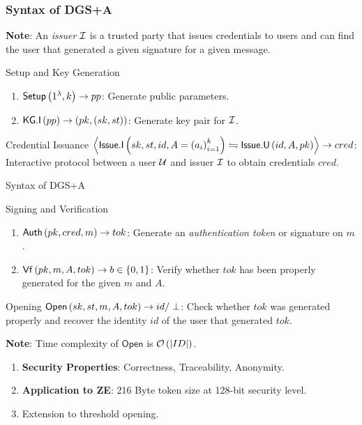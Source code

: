 \documentclass{beamer}
\begin{document}
    \begin{frame}
        \frametitle{Syntax of DGS+A}
        \textbf{Note}: An \emph{issuer} \(\mathcal I\) is a trusted party that issues
        credentials to users and can find the user that generated a given
        signature for a given message.
        \begin{block}{Setup and Key Generation}
            \begin{enumerate}
                \item \(\mathsf{Setup}\left(1^{\lambda}, k\right) \rightarrow pp\):
                Generate public parameters.
                \item \(\mathsf{KG.I}\left(pp\right) \rightarrow
                \left(pk,\left(sk,st\right)\right)\): Generate key pair for \(\mathcal I\).
            \end{enumerate}
        \end{block}
        \begin{block}{Credential Issuance}
            \(\left\langle \mathsf{Issue.I}\left(sk, st, id, A = \left(a_i\right)_{i=1}^k\right) \leftrightharpoons \mathsf{Issue.U}\left(id, A, pk\right) \right\rangle
            \rightarrow cred\): Interactive protocol between a user \(\mathcal U\) 
            and issuer \(\mathcal I\) to obtain credentials \(cred\).
        \end{block}
    \end{frame}

    \begin{frame}{Syntax of DGS+A}
        \begin{block}{Signing and Verification}
            \begin{enumerate}
                \item \(\mathsf{Auth}\left(pk, cred, m\right) \rightarrow tok\):
                Generate an \emph{authentication token} or signature on \(m\).
                \item \(\mathsf{Vf}\left(pk, m, A, tok\right) \rightarrow b \in
                \left\{0,1\right\}\): Verify whether \(tok\) has been properly
                generated for the given \(m\) and \(A\).
            \end{enumerate}
        \end{block}
        \begin{block}{Opening}
            \(\mathsf{Open}\left(sk, st, m, A, tok\right) \rightarrow id/\perp\):
            Check whether \(tok\) was generated properly and recover the
            identity \(id\) of the user that generated \(tok\).
            
            \textbf{Note}: Time complexity of \(\mathsf{Open}\) is
            \(\mathcal O\left(\left\vert ID\right\vert\right)\).
        \end{block}
        \begin{enumerate}
            \item \textbf{Security Properties}: Correctness, Traceability,
            Anonymity.
            \item \textbf{Application to ZE}: 216 Byte token size at 128-bit
            security level.
            \item Extension to threshold opening.
        \end{enumerate}
    \end{frame}
\end{document}
